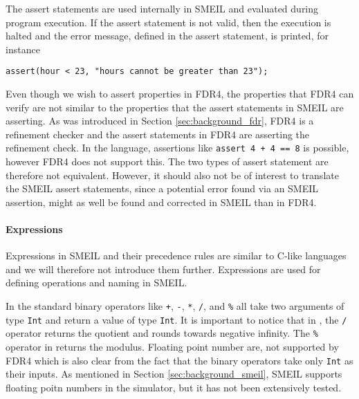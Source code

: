 The assert statements are used internally in SMEIL and evaluated during program execution. If the assert statement is not valid, then the execution is halted and the error message, defined in the assert statement, is printed, for instance
\begin{verbatim}
assert(hour < 23, "hours cannot be greater than 23");
\end{verbatim}

Even though we wish to assert properties in FDR4, the properties that FDR4 can verify are not similar to the properties that the assert statements in SMEIL are asserting. As was introduced in Section \ref{sec:background_fdr}, FDR4 is a refinement checker and the assert statements in FDR4 are asserting the refinement check. In the \cspm language, assertions like \texttt{assert 4 + 4 == 8} is possible, however FDR4 does not support this. The two types of assert statement are therefore not equivalent. However, it should also not be of interest to translate the SMEIL assert statements, since a potential error found via an SMEIL assertion, might as well be found and corrected in SMEIL than in FDR4.

\paragraph{Expressions}
Expressions in SMEIL and their precedence rules are similar to C-like languages and we will therefore not introduce them further. Expressions are used for defining operations and naming in SMEIL.

In \cspm the standard binary operators like \texttt{+}, \texttt{-}, \texttt{*}, \texttt{/}, and \texttt{\%} all take two arguments of type \texttt{Int} and return a value of type \texttt{Int}. It is important to notice that in \cspm, the \texttt{/} operator returns the quotient and rounds towards negative infinity. The \texttt{\%} operator in \cspm returns the modulus.
Floating point number are, not supported by FDR4\cite{Scattergood2011} which is also clear from the fact that the binary operators take only \texttt{Int} as their inputs.
As mentioned in Section \ref{sec:background_smeil}, SMEIL supports floating poitn numbers in the simulator, but it has not been extensively tested.

